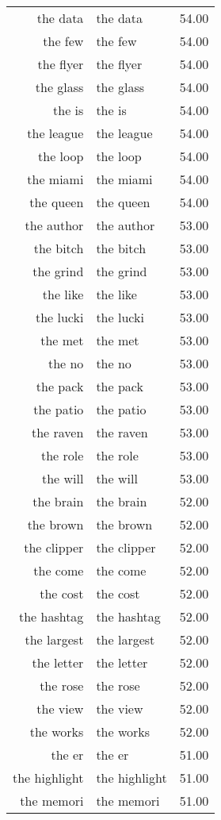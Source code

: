 \begin{table}[ht]
\begin{tabular}{rlr}
  the data & the data & 54.00 \\ 
  the few & the few & 54.00 \\ 
  the flyer & the flyer & 54.00 \\ 
  the glass & the glass & 54.00 \\ 
  the is & the is & 54.00 \\ 
  the league & the league & 54.00 \\ 
  the loop & the loop & 54.00 \\ 
  the miami & the miami & 54.00 \\ 
  the queen & the queen & 54.00 \\ 
  the author & the author & 53.00 \\ 
  the bitch & the bitch & 53.00 \\ 
  the grind & the grind & 53.00 \\ 
  the like & the like & 53.00 \\ 
  the lucki & the lucki & 53.00 \\ 
  the met & the met & 53.00 \\ 
  the no & the no & 53.00 \\ 
  the pack & the pack & 53.00 \\ 
  the patio & the patio & 53.00 \\ 
  the raven & the raven & 53.00 \\ 
  the role & the role & 53.00 \\ 
  the will & the will & 53.00 \\ 
  the brain & the brain & 52.00 \\ 
  the brown & the brown & 52.00 \\ 
  the clipper & the clipper & 52.00 \\ 
  the come & the come & 52.00 \\ 
  the cost & the cost & 52.00 \\ 
  the hashtag & the hashtag & 52.00 \\ 
  the largest & the largest & 52.00 \\ 
  the letter & the letter & 52.00 \\ 
  the rose & the rose & 52.00 \\ 
  the view & the view & 52.00 \\ 
  the works & the works & 52.00 \\ 
  the er & the er & 51.00 \\ 
  the highlight & the highlight & 51.00 \\ 
  the memori & the memori & 51.00 \\ 

\end{tabular}
\end{table}
